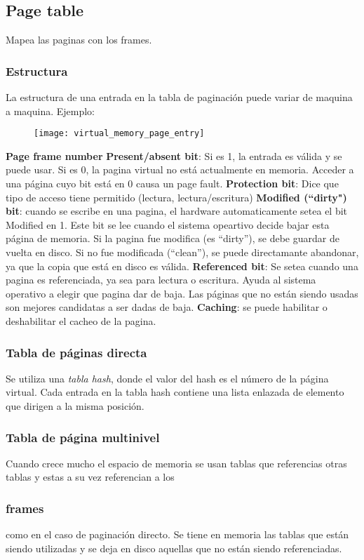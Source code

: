 \documentclass[a4paper, twoside]{article}
\begin{document}
\subsection{Page table}
Mapea las paginas con los frames.
\subsubsection{Estructura}
La estructura de una entrada en la tabla de paginación puede variar de maquina a maquina.
Ejemplo:
\begin{figure}[H]
	\centering
	\texttt{[image: virtual\_memory\_page\_entry]}
	\label{fig:virtual_memory_page_entry}
\end{figure}

\textbf{Page frame number}
\textbf{Present/absent bit}: Si es 1, la entrada es válida y se puede usar. Si es 0, la pagina virtual no está actualmente en memoria. Acceder a una página cuyo bit está en 0 causa un page fault.
\textbf{Protection bit}: Dice que tipo de acceso tiene permitido (lectura, lectura/escritura)
\textbf{Modified (“dirty") bit}: cuando se escribe en una pagina, el hardware automaticamente setea el bit Modified en 1. Este bit se lee cuando el sistema opeartivo decide bajar esta página de memoria. Si la pagina fue modifica (es “dirty”), se debe guardar de vuelta en disco. Si no fue modificada (“clean”), se puede directamante abandonar, ya que la copia que está en disco es válida.
\textbf{Referenced bit}: Se setea cuando una pagina es referenciada, ya sea para lectura o escritura. Ayuda al sistema operativo a elegir que pagina dar de baja. Las páginas que no están siendo usadas son mejores candidatas a ser dadas de baja.
\textbf{Caching}: se puede habilitar o deshabilitar el cacheo de la pagina.

\subsubsection{Tabla de páginas directa}
Se utiliza una \emph{tabla hash}, donde el valor del hash es el número de la página virtual. Cada entrada en la tabla hash contiene una lista enlazada de elemento que dirigen a la misma posición.

\subsubsection{Tabla de página multinivel}
Cuando crece mucho el espacio de memoria se usan tablas que referencias otras tablas y estas a su vez referencian a los \subsubsection{frames} como en el caso de paginación directo.
Se tiene en memoria las tablas que están siendo utilizadas y se deja en disco aquellas que no están siendo referenciadas.
\end{document}
